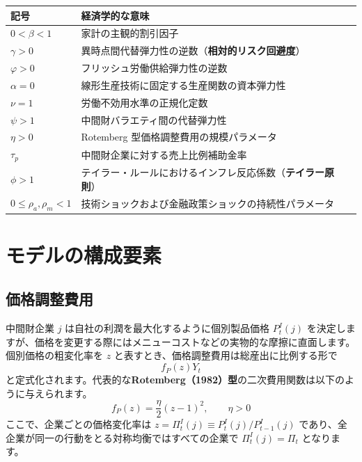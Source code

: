 \documentclass[
  japanese,
  lualatex,
  ja=standard,
  12pt,
  a4paper]{ltjsarticle}
\newcounter{none} %
\begin{document}
{\def\LTcaptype{none} %
\begin{longtable}[]{@{}
  >{\raggedright\arraybackslash}p{}
  >{\raggedright\arraybackslash}p{}@{}}
\toprule\noalign{}
\begin{minipage}[b]{\linewidth}\raggedright
記号
\end{minipage} & \begin{minipage}[b]{\linewidth}\raggedright
経済学的な意味
\end{minipage} \\
\midrule\noalign{}
\endhead
\bottomrule\noalign{}
\endlastfoot
\(0<\beta<1\) & 家計の主観的割引因子 \\
\(\gamma>0\) &
異時点間代替弾力性の逆数（\textbf{相対的リスク回避度}） \\
\(\varphi>0\) & フリッシュ労働供給弾力性の逆数 \\
\(\alpha=0\) & 線形生産技術に固定する生産関数の資本弾力性 \\
\(\nu=1\) & 労働不効用水準の正規化定数 \\
\(\psi>1\) & 中間財バラエティ間の代替弾力性 \\
\(\eta>0\) & Rotemberg 型価格調整費用の規模パラメータ \\
\(\tau_p\) & 中間財企業に対する売上比例補助金率 \\
\(\phi>1\) &
テイラー・ルールにおけるインフレ反応係数（\textbf{テイラー原則}） \\
\(0\leq\rho_a,\rho_m<1\) &
技術ショックおよび金融政策ショックの持続性パラメータ \\
\end{longtable}
}

\section{モデルの構成要素}\label{ux30e2ux30c7ux30ebux306eux69cbux6210ux8981ux7d20}

\subsection{価格調整費用}\label{ux4fa1ux683cux8abfux6574ux8cbbux7528}

中間財企業 \(j\) は自社の利潤を最大化するように個別製品価格 \(P_t^I(j)\)
を決定しますが、価格を変更する際にはメニューコストなどの実物的な摩擦に直面します。個別価格の粗変化率を
\(z\) と表すとき、価格調整費用は総産出に比例する形で \[
f_P(z)Y_t
\]
と定式化されます。代表的な\textbf{Rotemberg（1982）型}の二次費用関数は以下のように与えられます。
\[
f_P(z)=\frac{\eta}{2}(z-1)^2,
\qquad
\eta>0
\] ここで、企業ごとの価格変化率は
\(z=\Pi_t^I(j) \equiv P_t^I(j)/P_{t-1}^I(j)\)
であり、全企業が同一の行動をとる対称均衡ではすべての企業で
\(\Pi_t^I(j)=\Pi_t\) となります。
\end{document}

